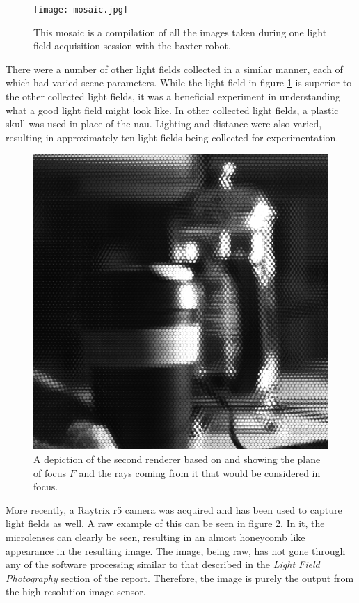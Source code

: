 \documentclass[12pt]{report}
\begin{document}
\begin{figure}[!ht]
	\centering
	\texttt{[image: mosaic.jpg]}
	\caption{This mosaic is a compilation of all the images taken during one light field acquisition session with the baxter robot.}
	\label{fig:nau_collected_images}
\end{figure}
There were a number of other light fields collected in a similar manner, each of which had varied scene parameters. While the light field in figure \ref{fig:nau_collected_images} is superior to the other collected light fields, it was a beneficial experiment in understanding what a good light field might look like. In other collected light fields, a plastic skull was used in place of the nau. Lighting and distance were also varied, resulting in approximately ten light fields being collected for experimentation. 

\begin{figure}[!ht]
	\centering
	\includegraphics[scale=0.2]{raytrix_raw.png}
	\caption{A depiction of the second renderer based on \cite{Isaksen01} and showing the plane of focus $F$ and the rays coming from it that would be considered in focus.}
	\label{fig:raytrix_raw}
\end{figure}
More recently, a Raytrix r5 camera was acquired and has been used to capture light fields as well. A raw example of this can be seen in figure \ref{fig:raytrix_raw}. In it, the microlenses can clearly be seen, resulting in an almost honeycomb like appearance in the resulting image. The image, being raw, has not gone through any of the software processing similar to that described in the \emph{Light Field Photography} section of the report. Therefore, the image is purely the output from the high resolution image sensor.
\end{document}
